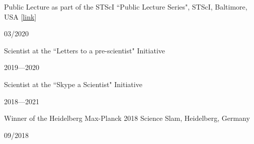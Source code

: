 \documentclass[12pt, a4paper]{article} %
\begin{document}
\vspace{0.2cm}

\begin{minipage}[t]{0.7\textwidth}
\begin{flushleft}%
  \setlength{\leftskip}{0.2cm}%
Public Lecture as part of the STScI ``Public Lecture Series", STScI, Baltimore, USA [\href{https://www.youtube.com/watch?v=hnAwLra9Kh8&t=1247s}{link}]
\end{flushleft}
\end{minipage}
\begin{minipage}[t]{0.3\textwidth}
\hfill 03/2020
\end{minipage}

\vspace{0.2cm}

\begin{minipage}[t]{0.7\textwidth}
\begin{flushleft}%
  \setlength{\leftskip}{0.2cm}%
Scientist at the ``Letters to a pre-scientist" Initiative
\end{flushleft}
\end{minipage}
\begin{minipage}[t]{0.3\textwidth}
\hfill 2019---2020
\end{minipage}

\vspace{0.2cm}

\begin{minipage}[t]{0.7\textwidth}
\begin{flushleft}%
  \setlength{\leftskip}{0.2cm}%
Scientist at the ``Skype a Scientist" Initiative
\end{flushleft}
\end{minipage}
\begin{minipage}[t]{0.3\textwidth}
\hfill 2018---2021
\end{minipage}

\vspace{0.2cm}

\begin{minipage}[t]{0.7\textwidth}
\begin{flushleft}%
  \setlength{\leftskip}{0.2cm}%
Winner of the Heidelberg Max-Planck 2018 Science Slam, Heidelberg, Germany 
\end{flushleft}
\end{minipage}
\begin{minipage}[t]{0.3\textwidth}
\hfill 09/2018
\end{minipage}

\vspace{0.2cm}
\end{document}
